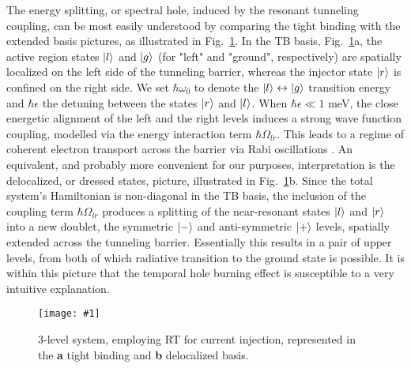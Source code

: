 \documentclass[reprint,secnumarabic,amssymb, nobibnotes, aip, prd]{revtex4-1}
\newcommand{\vspacec}{\vspace{-0.3cm}}
\newcommand{\includegraphicsXL}[1]{\texttt{[image: \#1]}}
\begin{document}
\vspacec
The energy splitting, or spectral hole, induced by the resonant tunneling coupling, can be most easily understood by comparing the tight binding with the extended basis pictures, as illustrated in Fig.~\ref{fig:basisnew}. In the TB basis, Fig.~\ref{fig:basisnew}a, the active region states $\ket{l}$ and $\ket{g}$ (for "left" and "ground", respectively) are spatially localized on the left side of the tunneling barrier, whereas the injector state $\ket{r}$ is confined on the right side. We set $\hbar\omega_0$ to denote the $\ket{l} \leftrightarrow \ket{g}$ transition energy and $\hbar\epsilon$ the detuning between the states $\ket{r}$ and $\ket{l}$. When $\hbar \epsilon \ll 1 $ meV, the close energetic alignment of the left and the right levels induces a strong wave function coupling, modelled via the energy interaction term $\hbar\Omega_{lr}$. This leads to a regime of coherent electron transport across the barrier via Rabi oscillations \cite{callebaut2005importance}. An equivalent, and probably more convenient for our purposes, interpretation is the delocalized, or dressed states, picture, illustrated in Fig.~\ref{fig:basisnew}b. Since the total system's Hamiltonian is non-diagonal in the TB basis, the inclusion of the coupling term $\hbar\Omega_{lr}$ produces a splitting of the near-resonant states $\ket{l}$ and $\ket{r}$ into a new doublet, the symmetric $\ket{-}$ and anti-symmetric $\ket{+}$ levels, spatially extended across the tunneling barrier. Essentially this results in a pair of upper levels, from both of which radiative transition to the ground state is possible. It is within this picture that the temporal hole burning effect is susceptible to a very intuitive explanation. 
\begin{figure}[h!]
	\begin{center}
		\includegraphicsXL{IMGS/basisnew.eps}
		\caption{3-level system, employing RT for current injection, represented in the \textbf{a} tight binding and \textbf{b} delocalized basis. } \label{fig:basisnew}
	\end{center}	
\end{figure}
\end{document}
